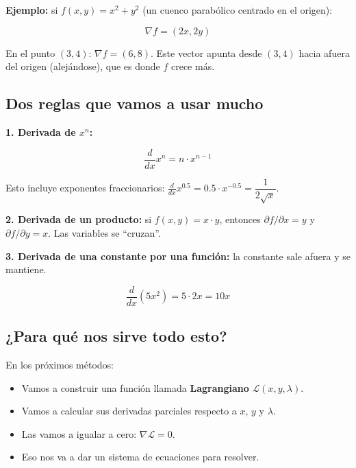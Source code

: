 \documentclass[12pt]{article}
\begin{document}
\vspace{0.5em}

\textbf{Ejemplo:} si $f(x, y) = x^2 + y^2$ (un cuenco parabólico centrado en el origen):

\[
\nabla f = (2x, 2y)
\]

En el punto $(3, 4)$: $\nabla f = (6, 8)$. Este vector apunta desde $(3,4)$ hacia afuera del origen (alejándose), que es donde $f$ crece más.

\subsection{Dos reglas que vamos a usar mucho}

\textbf{1. Derivada de $x^n$:}

\[
\frac{d}{dx} x^n = n \cdot x^{n-1}
\]

Esto incluye exponentes fraccionarios: $\frac{d}{dx} x^{0.5} = 0.5 \cdot x^{-0.5} = \dfrac{1}{2\sqrt{x}}$.

\vspace{0.5em}

\textbf{2. Derivada de un producto:} si $f(x, y) = x \cdot y$, entonces $\partial f / \partial x = y$ y $\partial f / \partial y = x$. Las variables se ``cruzan''.

\vspace{0.5em}

\textbf{3. Derivada de una constante por una función:} la constante sale afuera y se mantiene.

\[
\frac{d}{dx} (5 x^2) = 5 \cdot 2x = 10x
\]

\subsection{¿Para qué nos sirve todo esto?}

En los próximos métodos:

\begin{itemize}
    \item Vamos a construir una función llamada \textbf{Lagrangiano} $\mathcal{L}(x, y, \lambda)$.
    \item Vamos a calcular sus derivadas parciales respecto a $x$, $y$ y $\lambda$.
    \item Las vamos a igualar a cero: $\nabla \mathcal{L} = 0$.
    \item Eso nos va a dar un sistema de ecuaciones para resolver.
\end{itemize}

\vspace{0.5em}
\end{document}
